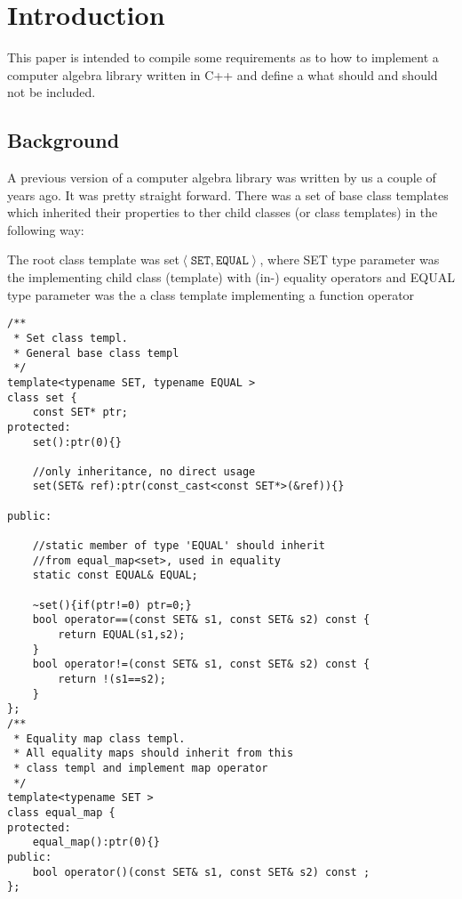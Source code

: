 \section{Introduction}
This paper is intended to compile some requirements as to how to implement a computer algebra library written in \textsf{C++} and define a what should and should not be included.
\subsection{Background}
A previous version of a computer algebra library was written by us a couple of years ago. It was pretty straight forward. There was a set of base class templates which inherited their properties to ther child classes (or class templates) in the following way:
\newcommand{\lstss}[1]{\textsf{#1}}
\newcommand{\lstst}{\lstss{set$\left<\mathtt{SET,EQUAL}\right>$}}
\bn
\item The root class template was \lstst, where \textsf{SET} type parameter was the implementing child class (template) with (in-) equality operators and \textsf{EQUAL} type parameter was the a class template implementing a function operator\\
\begin{lstlisting}[frame=single]
/**
 * Set class templ.
 * General base class templ
 */
template<typename SET, typename EQUAL >
class set {
	const SET* ptr;
protected:
	set():ptr(0){}
	
	//only inheritance, no direct usage
	set(SET& ref):ptr(const_cast<const SET*>(&ref)){}
	
public:

	//static member of type 'EQUAL' should inherit
   	//from equal_map<set>, used in equality
	static const EQUAL& EQUAL;
   	
	~set(){if(ptr!=0) ptr=0;}
	bool operator==(const SET& s1, const SET& s2) const {
		return EQUAL(s1,s2);
	}
	bool operator!=(const SET& s1, const SET& s2) const {
		return !(s1==s2);
	}
};
/**
 * Equality map class templ.
 * All equality maps should inherit from this
 * class templ and implement map operator
 */
template<typename SET >
class equal_map {
protected:
	equal_map():ptr(0){}
public:
	bool operator()(const SET& s1, const SET& s2) const ;
};
\end{lstlisting}
\newcommand{\lstsg}{\lstss{semi\_{}group$\left<SEMI,EQUAL,OPER \right>$}}
